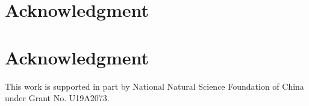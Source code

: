 \documentclass[10pt,journal,compsoc]{IEEEtran}
\begin{document}
\vspace{-.1in}
\ifCLASSOPTIONcompsoc
\section*{Acknowledgment}
\else
\section*{Acknowledgment}
\fi
This work is supported in part by National Natural Science Foundation of China under Grant No. U19A2073.

%

\ifCLASSOPTIONcaptionsoff
\newpage
\fi
\vspace{-.1in}


\end{document}
